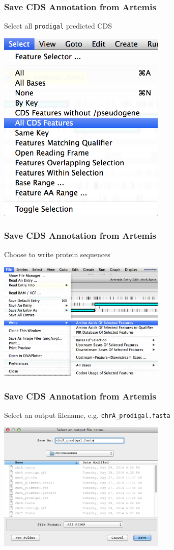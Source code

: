     \begin{frame}
      \frametitle{Save CDS Annotation from Artemis}   
      Select all \texttt{prodigal} predicted CDS
      \begin{center}
        \includegraphics[width=0.6\textwidth]{images/export1}     
      \end{center}        
    \end{frame}

    \begin{frame}
      \frametitle{Save CDS Annotation from Artemis}   
      Choose to write protein sequences
      \begin{center}
        \includegraphics[width=0.6\textwidth]{images/export2}     
      \end{center}        
    \end{frame}

    \begin{frame}
      \frametitle{Save CDS Annotation from Artemis}   
      Select an output filename, e.g. \texttt{chrA\_prodigal.fasta}
      \begin{center}
        \includegraphics[width=0.6\textwidth]{images/export3}     
      \end{center}        
    \end{frame}


